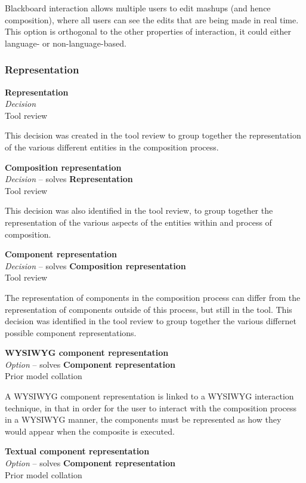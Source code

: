 Blackboard interaction allows multiple users to edit mashups (and hence composition), where all users can see the edits that are being made in real time. This option is orthogonal to the other properties of interaction, it could either language- or non-language-based.

\subsubsection{Representation}

\textbf{Representation} \\ \emph{Decision} \\ Tool review

This decision was created in the tool review to group together the representation of the various different entities in the composition process.

\textbf{Composition representation} \\ \emph{Decision} -- solves \textbf{Representation} \\ Tool review

This decision was also identified in the tool review, to group together the representation of the various aspects of the entities within and process of composition.

\textbf{Component representation} \\ \emph{Decision} -- solves \textbf{Composition representation} \\ Tool review

The representation of components in the composition process can differ from the representation of components outside of this process, but still in the tool. This decision was identified in the tool review to group together the various differnet possible component representations.

\textbf{WYSIWYG component representation} \\ \emph{Option} -- solves \textbf{Component representation} \\ Prior model collation \cite{Aghaee2012}

A WYSIWYG component representation is linked to a WYSIWYG interaction technique, in that in order for the user to interact with the composition process in a WYSIWYG manner, the components must be represented as how they would appear when the composite is executed.

\textbf{Textual component representation} \\ \emph{Option} -- solves \textbf{Component representation} \\ Prior model collation \cite{Aghaee2012,Fischer2009,Pietschmann2010}

